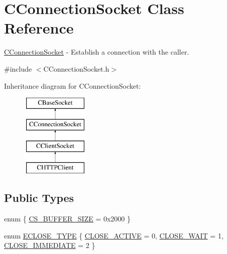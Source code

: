 \hypertarget{class_c_connection_socket}{\section{\-C\-Connection\-Socket \-Class \-Reference}
\label{class_c_connection_socket}
}


\hyperlink{class_c_connection_socket}{\-C\-Connection\-Socket} -\/ \-Establish a connection with the caller.  




{\ttfamily \#include $<$\-C\-Connection\-Socket.\-h$>$}

\-Inheritance diagram for \-C\-Connection\-Socket\-:\begin{figure}[H]
\begin{center}
\leavevmode
\includegraphics[height=4.000000cm]{class_c_connection_socket}
\end{center}
\end{figure}
\subsection*{\-Public \-Types}
\begin{DoxyCompactItemize}
\item 
enum \{ \hyperlink{class_c_connection_socket_a0d76efb3e65e70281ce2f12dc36dc329a5b96f929feebb30dc72b969542959beb}{\-C\-S\-\_\-\-B\-U\-F\-F\-E\-R\-\_\-\-S\-I\-Z\-E} =  0x2000
 \}
\item 
enum \hyperlink{class_c_connection_socket_a8a17c63c4d0bd7ea0041fbdbd3afc821}{\-E\-C\-L\-O\-S\-E\-\_\-\-T\-Y\-P\-E} \{ \hyperlink{class_c_connection_socket_a8a17c63c4d0bd7ea0041fbdbd3afc821aa4e6154bcc69b59bd3a74ce0c218da3a}{\-C\-L\-O\-S\-E\-\_\-\-A\-C\-T\-I\-V\-E} =  0, 
\hyperlink{class_c_connection_socket_a8a17c63c4d0bd7ea0041fbdbd3afc821a8a49384dfb9d5d199d06bf076294fa95}{\-C\-L\-O\-S\-E\-\_\-\-W\-A\-I\-T} =  1, 
\hyperlink{class_c_connection_socket_a8a17c63c4d0bd7ea0041fbdbd3afc821abe6c0dccf410f304f04098080744411e}{\-C\-L\-O\-S\-E\-\_\-\-I\-M\-M\-E\-D\-I\-A\-T\-E} =  2
 \}
\end{DoxyCompactItemize}
